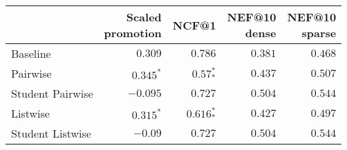 \begin{tabular}{lrrrr}
\toprule
             & \makecell{Scaled \\ promotion} & NCF@1 & \makecell{NEF@10 \\ dense} & \makecell{NEF@10 \\ sparse} \\
\midrule
       Baseline & $0.309$ & $0.786$ & $0.381$ & $0.468$ \\
       Pairwise & $0.345^{*}$ & $0.57_{*}^{*}$ & $0.437$ & $0.507$ \\
       Student Pairwise & $-0.095$ & $0.727$ & $0.504$ & $0.544$ \\
       Listwise & $0.315^{*}$ & $0.616^{*}_{*}$ & $0.427$ & $0.497$ \\
       Student Listwise & $-0.09$ & $0.727$ & $0.504$ & $0.544$\\
\bottomrule
\end{tabular}




